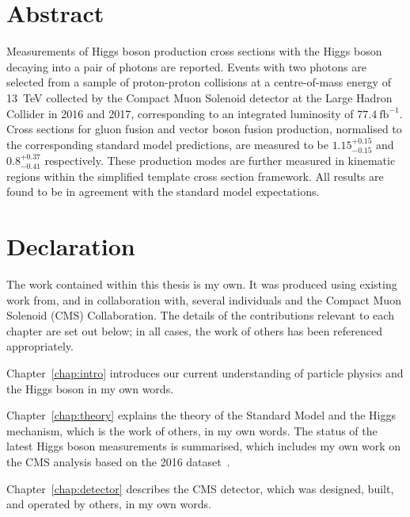 \chapter*{\centering Abstract}
Measurements of Higgs boson production cross sections 
with the Higgs boson decaying into a pair of photons are reported.
Events with two photons are selected from a sample of proton-proton collisions 
at a centre-of-mass energy of \SI{13}{TeV} 
collected by the Compact Muon Solenoid detector at the Large Hadron Collider in 2016 and 2017,
corresponding to an integrated luminosity of $77.4~\mathrm{fb}^{-1}$.
Cross sections for gluon fusion and vector boson fusion production, 
normalised to the corresponding standard model predictions,
are measured to be $1.15_{-0.15}^{+0.15}$ and $0.8_{-0.41}^{+0.37}$ respectively.
These production modes are further measured in kinematic regions 
within the simplified template cross section framework.
All results are found to be in agreement with the standard model expectations.




\chapter*{\centering Declaration}
The work contained within this thesis is my own. 
It was produced using existing work from, and in collaboration with, 
several individuals and the Compact Muon Solenoid (CMS) Collaboration. 
The details of the contributions relevant to each chapter are set out below;
in all cases, the work of others has been referenced appropriately.

Chapter~\ref{chap:intro} introduces our current understanding of particle physics 
and the Higgs boson in my own words.

Chapter~\ref{chap:theory} explains the theory of the Standard Model and the Higgs mechanism, 
which is the work of others, in my own words. 
The status of the latest Higgs boson measurements is summarised, 
which includes my own work on the CMS \Hgg analysis based on the 2016 dataset~\cite{HIG-16-040}.

Chapter~\ref{chap:detector} describes the CMS detector, 
which was designed, built, and operated by others, in my own words.

